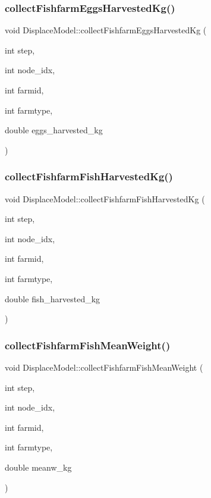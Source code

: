 \subsubsection{\texorpdfstring{collectFishfarmEggsHarvestedKg()}{collectFishfarmEggsHarvestedKg()}}
{\footnotesize\ttfamily void Displace\+Model\+::collect\+Fishfarm\+Eggs\+Harvested\+Kg (\begin{DoxyParamCaption}\item[{int}]{step,  }\item[{int}]{node\+\_\+idx,  }\item[{int}]{farmid,  }\item[{int}]{farmtype,  }\item[{double}]{eggs\+\_\+harvested\+\_\+kg }\end{DoxyParamCaption})}

\mbox{\label{class_displace_model_a16b00f7ba8dd52fc7873c162685607d8}} 
\subsubsection{\texorpdfstring{collectFishfarmFishHarvestedKg()}{collectFishfarmFishHarvestedKg()}}
{\footnotesize\ttfamily void Displace\+Model\+::collect\+Fishfarm\+Fish\+Harvested\+Kg (\begin{DoxyParamCaption}\item[{int}]{step,  }\item[{int}]{node\+\_\+idx,  }\item[{int}]{farmid,  }\item[{int}]{farmtype,  }\item[{double}]{fish\+\_\+harvested\+\_\+kg }\end{DoxyParamCaption})}

\mbox{\label{class_displace_model_a0c5606d571f92802cf8ef5c4409d880a}} 
\subsubsection{\texorpdfstring{collectFishfarmFishMeanWeight()}{collectFishfarmFishMeanWeight()}}
{\footnotesize\ttfamily void Displace\+Model\+::collect\+Fishfarm\+Fish\+Mean\+Weight (\begin{DoxyParamCaption}\item[{int}]{step,  }\item[{int}]{node\+\_\+idx,  }\item[{int}]{farmid,  }\item[{int}]{farmtype,  }\item[{double}]{meanw\+\_\+kg }\end{DoxyParamCaption})}


